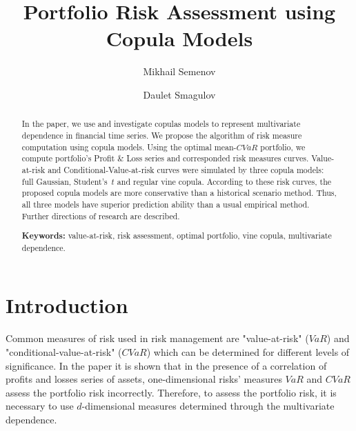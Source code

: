 \documentclass{llncs}
\begin{document}
\title{Portfolio Risk Assessment using Copula Models%
    }

\author{
Mikhail Semenov \and Daulet Smagulov}


\maketitle

\begin{abstract}
In the paper, we use and investigate copulas models to represent multivariate dependence in financial time series. We propose the algorithm of risk measure computation using copula models. Using the optimal mean-$CVaR$ portfolio, we compute portfolio's Profit \& Loss series and corresponded risk measures curves.
Value-at-risk and Conditional-Value-at-risk curves were simulated by three copula models: full Gaussian, Student's~$t$ and regular vine copula. 
According to these risk curves, the proposed copula models are more conservative than a historical scenario method. %
Thus, all three models have superior prediction ability than a usual empirical method. Further directions of research are described.

\textbf{Keywords:} value-at-risk, risk assessment, optimal portfolio, vine copula, multivariate dependence.
\end{abstract}

\section{Introduction}

Common measures of risk  used in risk management are "value-at-risk" ($VaR$) and "conditional-value-at-risk" ($CVaR$) which can be determined for different levels of significance. In the paper \cite{Kritski2007} it is shown that in the presence of a correlation of profits and losses series of assets, one-dimensional risks' measures $VaR$ and $CVaR$  assess the portfolio risk incorrectly. Therefore, to assess the portfolio risk, it is necessary to use $d$-dimensional measures determined through the multivariate dependence.
\end{document}
